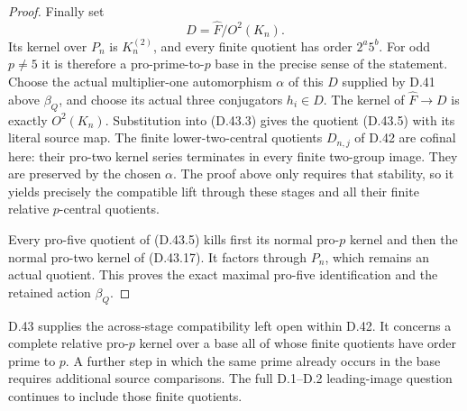 \begin{proof}
Finally set
\[
                 D=\widehat F/O^2(K_n).
 \tag{D.43.17}
\]
Its kernel over \(P_n\)
is \(K_n^{(2)}\), and
every finite quotient
has order \(2^a5^b\).
For odd \(p\ne5\) it is
therefore a pro-prime-to-\(p\)
base in the precise sense
of the statement.
Choose the actual
multiplier-one automorphism
\(\alpha\) of this \(D\)
supplied by D.41 above
\(\beta_Q\), and choose
its actual three
conjugators \(h_i\in D\).
The kernel of
\(\widehat F\to D\) is
exactly \(O^2(K_n)\).
Substitution into
\textup{(D.43.3)} gives
the quotient
\textup{(D.43.5)} with
its literal source map.
The finite lower-two-central
quotients \(D_{n,j}\) of
D.42 are cofinal here:
their pro-two kernel
series terminates in
every finite two-group
image.
They are preserved by
the chosen \(\alpha\).
The proof above only
requires that stability,
so it yields precisely
the compatible lift
through these stages
and all their finite
relative \(p\)-central
quotients.

Every pro-five quotient
of \textup{(D.43.5)}
kills first its normal
pro-\(p\) kernel and
then the normal pro-two
kernel of
\textup{(D.43.17)}.
It factors through \(P_n\),
which remains an actual
quotient.
This proves the exact
maximal pro-five
identification and
the retained action
\(\beta_Q\).
\end{proof}

D.43 supplies the
across-stage compatibility
left open within D.42.
It concerns a complete
relative pro-\(p\) kernel
over a base all of whose
finite quotients have
order prime to \(p\).
A further step in which
the same prime already
occurs in the base
requires additional
source comparisons.
The full D.1--D.2
leading-image question
continues to include
those finite quotients.
